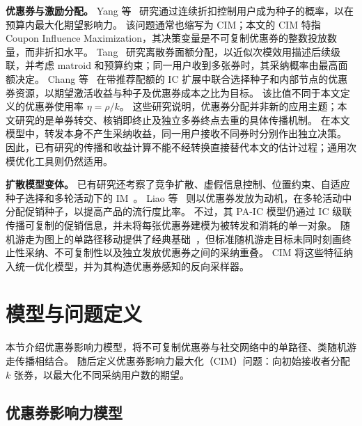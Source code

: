 \documentclass[sigconf,balance=false]{acmart}
\begin{document}
\textbf{优惠券与激励分配。}
Yang 等~\cite{yang2016continuous} 研究通过连续折扣控制用户成为种子的概率，以在预算内最大化期望影响力。
该问题通常也缩写为 CIM；本文的 CIM 特指 Coupon Influence Maximization，其决策变量是不可复制优惠券的整数投放数量，而非折扣水平。
Tang~\cite{tang2018coupon} 研究离散券面额分配，以近似次模效用描述后续级联，并考虑 matroid 和预算约束；同一用户收到多张券时，其采纳概率由最高面额决定。
Chang 等~\cite{chang2019socialcoupon} 在带推荐配额的 IC 扩展中联合选择种子和内部节点的优惠券资源，以期望激活收益与种子及优惠券成本之比为目标。
该比值不同于本文定义的优惠券使用率 $\eta=\rho/k$。
这些研究说明，优惠券分配并非新的应用主题；本文研究的是单券转交、核销即终止及独立多券终点去重的具体传播机制。
在本文模型中，转发本身不产生采纳收益，同一用户接收不同券时分别作出独立决策。
因此，已有研究的传播和收益计算不能不经转换直接替代本文的估计过程；通用次模优化工具则仍然适用。

\textbf{扩散模型变体。}
已有研究还考察了竞争扩散、虚假信息控制、位置约束、自适应种子选择和多轮活动下的 IM~\cite{budak2011limiting,li2014efficient,lu2015competition,seeman2013adaptive,sun2018multi}。
Liao 等~\cite{liao2023popularity} 则以优惠券发放为动机，在多轮活动中分配促销种子，以提高产品的流行度比率。
不过，其 PA-IC 模型仍通过 IC 级联传播可复制的促销信息，并未将每张优惠券建模为被转发和消耗的单一对象。
随机游走为图上的单路径移动提供了经典基础~\cite{lovasz1993random}，但标准随机游走目标未同时刻画终止性采纳、不可复制性以及独立发放优惠券之间的采纳重叠。
CIM 将这些特征纳入统一优化模型，并为其构造优惠券感知的反向采样器。

\section{模型与问题定义}
\label{sec:model}

本节介绍优惠券影响力模型，将不可复制优惠券与社交网络中的单路径、类随机游走传播相结合。
随后定义优惠券影响力最大化（CIM）问题：向初始接收者分配 $k$ 张券，以最大化不同采纳用户数的期望。

\subsection{优惠券影响力模型}
\end{document}
